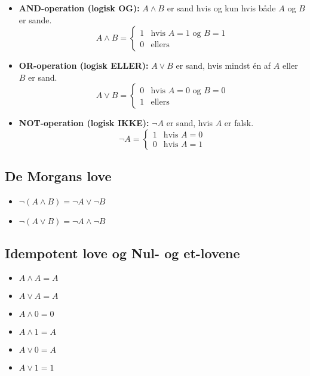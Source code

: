 \documentclass{article}
\begin{document}
\begin{itemize}
    \item \textbf{AND-operation (logisk OG):} \( A \land B \) er sand hvis og kun hvis både \( A \) og \( B \) er sande.
    \[ A \land B = 
    \begin{cases} 
    1 & \text{hvis } A = 1 \text{ og } B = 1 \\
    0 & \text{ellers}
    \end{cases}
    \]

    \item \textbf{OR-operation (logisk ELLER):} \( A \lor B \) er sand, hvis mindst én af \( A \) eller \( B \) er sand.
    \[ A \lor B = 
    \begin{cases} 
    0 & \text{hvis } A = 0 \text{ og } B = 0 \\
    1 & \text{ellers}
    \end{cases}
    \]

    \item \textbf{NOT-operation (logisk IKKE):} \( \neg A \) er sand, hvis \( A \) er falsk.
    \[ \neg A = 
    \begin{cases} 
    1 & \text{hvis } A = 0 \\
    0 & \text{hvis } A = 1
    \end{cases}
    \]
\end{itemize}

\subsection{De Morgans love}

\begin{itemize}
    \item \( \neg (A \land B) = \neg A \lor \neg B \)
    \item \( \neg (A \lor B) = \neg A \land \neg B \)
\end{itemize}

\subsection{Idempotent love og Nul- og et-lovene}

\begin{itemize}
    \item \( A \land A = A \)
    \item \( A \lor A = A \)
    \item \( A \land 0 = 0 \)
    \item \( A \land 1 = A \)
    \item \( A \lor 0 = A \)
    \item \( A \lor 1 = 1 \)
\end{itemize}
\end{document}
